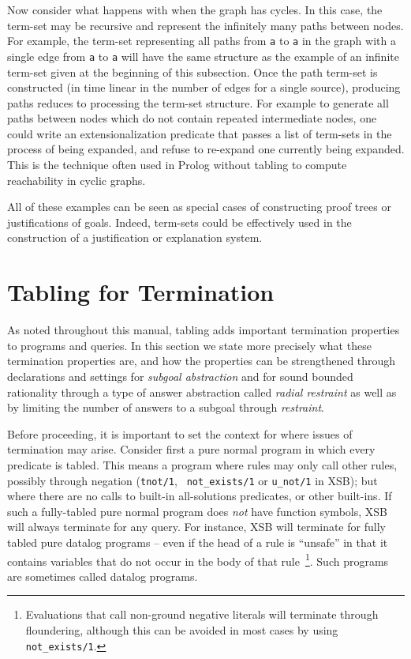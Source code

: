 Now consider what happens with when the graph has cycles.  In this
case, the term-set may be recursive and represent the infinitely many
paths between nodes.  For example, the term-set representing all paths
from {\tt a} to {\tt a} in the graph with a single edge from {\tt a} to
{\tt a} will have the same structure as the example of an infinite
term-set given at the beginning of this subsection.  Once the path
term-set is constructed (in time linear in the number of edges for a
single source), producing paths reduces to processing the term-set
structure.  For example to generate all paths between nodes which do
not contain repeated intermediate nodes, one could write an
extensionalization predicate that passes a list of term-sets in the
process of being expanded, and refuse to re-expand one currently being
expanded.  This is the technique often used in Prolog without tabling
to compute reachability in cyclic graphs.

All of these examples can be seen as special cases of constructing
proof trees or justifications of goals.  Indeed, term-sets could be
effectively used in the construction of a justification or explanation
system.

\section{Tabling for Termination} \label{sec:tabling-termination}
%
As noted throughout this manual, tabling adds important termination
properties to programs and queries.  In this section we state more
precisely what these termination properties are, and how the
properties can be strengthened through declarations and settings for
{\em subgoal abstraction} and for sound bounded rationality through a
type of answer abstraction called {\em radial restraint} as well as by
limiting the number of answers to a subgoal through {\em \maxans{}
  restraint}.

Before proceeding, it is important to set the context for where issues
of termination may arise.  Consider first a pure normal program in
which every predicate is tabled.  This means a program where rules may
only call other rules, possibly through negation ({\tt tnot/1}, {\tt
  not\_exists/1} or {\tt u\_not/1} in XSB); but where there are no
calls to built-in all-solutions predicates, or other built-ins.  If
such a fully-tabled pure normal program does {\em not} have function
symbols, XSB will always terminate for any query.  For instance, XSB
will terminate for fully tabled pure datalog programs -- even if the
head of a rule is ``unsafe'' in that it contains variables that do not
occur in the body of that rule~\footnote{Evaluations that call
  non-ground negative literals will terminate through floundering,
  although this can be avoided in most cases by using {\tt
    not\_exists/1}.}.  Such programs are sometimes called datalog
programs.

